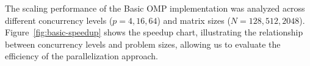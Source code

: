 



The scaling performance of the Basic OMP implementation was analyzed across different concurrency levels (\(p = 4, 16, 64\)) and matrix sizes (\(N = 128, 512, 2048\)). Figure~\ref{fig:basic-speedup} shows the speedup chart, illustrating the relationship between concurrency levels and problem sizes, allowing us to evaluate the efficiency of the parallelization approach.

